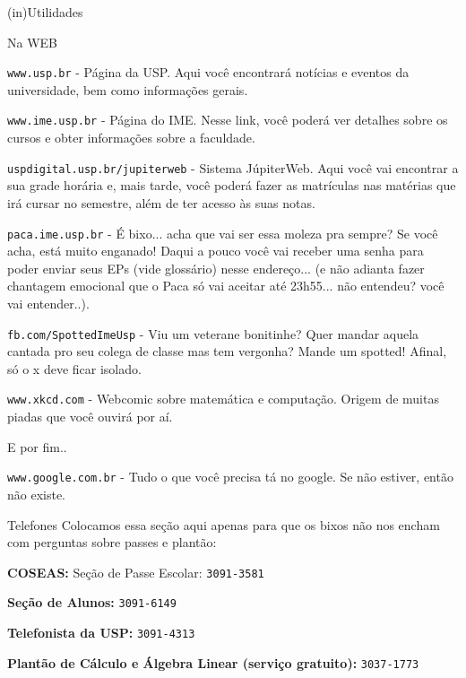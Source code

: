 \begin{secao}{(in)Utilidades}

\begin{subsecao}{Na WEB}

{\tt www.usp.br} - Página da USP. Aqui você encontrará notícias e eventos da
universidade, bem como informações gerais.

{\tt www.ime.usp.br} - Página do IME.
Nesse link, você poderá ver detalhes sobre os cursos e obter informações sobre
a faculdade.

{\tt uspdigital.usp.br/jupiterweb} - Sistema JúpiterWeb. Aqui você vai
encontrar a sua grade horária e, mais tarde, você poderá fazer as matrículas nas
matérias que irá cursar no semestre, além de ter acesso às suas notas.

{\tt paca.ime.usp.br} - É bixo... acha que vai ser essa moleza pra sempre? Se
você acha, está muito enganado! Daqui a pouco você vai receber uma senha para
poder enviar seus EPs (vide glossário) nesse endereço... (e não adianta fazer
chantagem emocional que o Paca só vai aceitar até 23h55... não entendeu? você
vai entender..).

{\tt fb.com/SpottedImeUsp} - Viu um veterane bonitinhe? Quer mandar aquela
cantada pro seu colega de classe mas tem vergonha? Mande um spotted! Afinal,
só o x deve ficar isolado.

{\tt www.xkcd.com} - Webcomic sobre matemática e computação. Origem de muitas
piadas que você ouvirá por aí.

E por fim..

{\tt www.google.com.br} - Tudo o que você precisa tá no google. Se não estiver,
então não existe.

\end{subsecao}

\begin{subsecao}{Telefones}
Colocamos essa seção aqui apenas para que os bixos não nos encham com perguntas
sobre passes e plantão:

{\bf COSEAS:} Seção de Passe Escolar: {\tt 3091-3581}

{\bf Seção de Alunos:} {\tt 3091-6149}

{\bf Telefonista da USP:} {\tt 3091-4313}

{\bf Plantão de Cálculo e Álgebra Linear (serviço gratuito):} {\tt 3037-1773}

\end{subsecao}
\end{secao}
